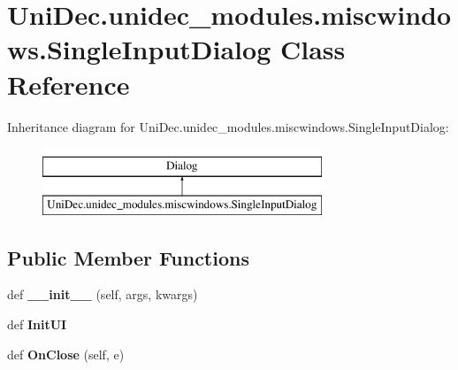 \hypertarget{class_uni_dec_1_1unidec__modules_1_1miscwindows_1_1_single_input_dialog}{}\section{Uni\+Dec.\+unidec\+\_\+modules.\+miscwindows.\+Single\+Input\+Dialog Class Reference}
\label{class_uni_dec_1_1unidec__modules_1_1miscwindows_1_1_single_input_dialog}
Inheritance diagram for Uni\+Dec.\+unidec\+\_\+modules.\+miscwindows.\+Single\+Input\+Dialog\+:\begin{figure}[H]
\begin{center}
\leavevmode
\includegraphics[height=2.000000cm]{class_uni_dec_1_1unidec__modules_1_1miscwindows_1_1_single_input_dialog}
\end{center}
\end{figure}
\subsection*{Public Member Functions}
\begin{DoxyCompactItemize}
\item 
\hypertarget{class_uni_dec_1_1unidec__modules_1_1miscwindows_1_1_single_input_dialog_a828986681121f8bf000570daecfbfafa}{}def {\bfseries \+\_\+\+\_\+init\+\_\+\+\_\+} (self, args, kwargs)\label{class_uni_dec_1_1unidec__modules_1_1miscwindows_1_1_single_input_dialog_a828986681121f8bf000570daecfbfafa}

\item 
\hypertarget{class_uni_dec_1_1unidec__modules_1_1miscwindows_1_1_single_input_dialog_a0fc612f4cd76256c9f56936d111bf877}{}def {\bfseries Init\+U\+I}\label{class_uni_dec_1_1unidec__modules_1_1miscwindows_1_1_single_input_dialog_a0fc612f4cd76256c9f56936d111bf877}

\item 
\hypertarget{class_uni_dec_1_1unidec__modules_1_1miscwindows_1_1_single_input_dialog_aa532313f92d92f4d34211b0ea16af291}{}def {\bfseries On\+Close} (self, e)\label{class_uni_dec_1_1unidec__modules_1_1miscwindows_1_1_single_input_dialog_aa532313f92d92f4d34211b0ea16af291}

\end{DoxyCompactItemize}
